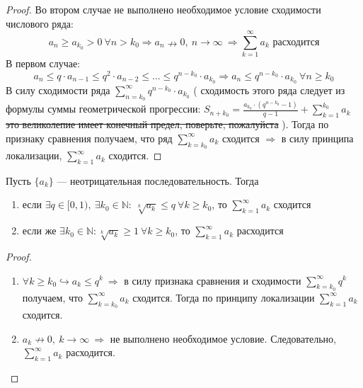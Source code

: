 \documentclass[11pt]{article}
\begin{document}
\begin{proof}
    Во втором случае не выполнено необходимое условие сходимости числового ряда: \[a_n \geq a_{k_0} > 0 \ \forall n > k_0 \Longrightarrow
    a_n \nrightarrow 0, \ n \to \infty \ \Longrightarrow \sum_{k = 1}^{\infty} a_k \text{ расходится}\]
    В первом случае: \[a_n \leq q \cdot a_{n - 1} \leq q^2 \cdot a_{n - 2} \leq ... \leq q^{n - k_0} \cdot a_{k_0} \Longrightarrow
    a_n \leq q^{n - k_0} \cdot a_{k_0} \ \forall n \geq k_0\] В силу сходимости ряда $\displaystyle \sum_{n = k_0}^{\infty} q^{n - k_0} \cdot a_{k_0}$
    \bigg( сходимость этого ряда следует из формулы суммы геометрической прогрессии: $\displaystyle S_{n + k_0} = \frac{a_{k_0} \cdot (q^{n - k_0} -1)}{q - 1} + 
    \sum_{k = 1}^{k_0} a_k$ \st{это великолепие имеет конечный предел, поверьте, пожалуйста} \bigg). Тогда по признаку сравнения получаем, что ряд 
    $\displaystyle \sum_{k = k_0}^{\infty} a_k$ сходится $\Longrightarrow$ в силу принципа локализации, $\displaystyle \sum_{k = 1}^{\infty} a_k$ сходится.
\end{proof}

\begin{theorem}
    Пусть $\{a_k\}$ --- неотрицательная последовательность. Тогда 
    \begin{enumerate}
        \item если $\exists q \in [0, 1), \ \exists k_0 \in \mathbb{N}: \ \sqrt[k]{a_k} \leq q  \ \forall k \geq k_0$, то $\displaystyle \sum_{k = 1}^{\infty} a_k$ сходится
        \item если же $\exists k_0 \in \mathbb{N}: \sqrt[k]{a_k} \geq 1 \ \forall k \geq k_0$, то $\displaystyle \sum_{k = 1}^{\infty} a_k$ расходится
    \end{enumerate}
\end{theorem}

\begin{proof}
    \begin{enumerate}
        \item $\forall k \geq k_0 \hookrightarrow a_k \leq q^k \ \Longrightarrow$ в силу признака сравнения и сходимости $\displaystyle \sum_{k = k_0}^{\infty} q^k$  
        получаем, что $\displaystyle \sum_{k = k_0}^{\infty} a_k$ сходится. Тогда по принципу локализации $\displaystyle \sum_{k = 1}^{\infty} a_k$ сходится.
        \item $a_k \nrightarrow 0, \ k \to \infty \ \Longrightarrow$ не выполнено необходимое условие. Следовательно, $\displaystyle \sum_{k = 1}^{\infty} a_k$ расходится.
    \end{enumerate}
\end{proof}
\end{document}
